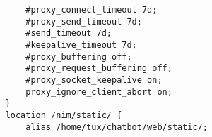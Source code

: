 \documentclass{article}
\begin{document}
\begin{verbatim}
        #proxy_connect_timeout 7d;                                                                                                                                                                                                                            
        #proxy_send_timeout 7d;                                                                                                                                                                                                                               
        #send_timeout 7d;                                                                                                                                                                                                                                     
        #keepalive_timeout 7d;                                                                                                                                                                                                                                
        #proxy_buffering off;                                                                                                                                                                                                                                 
        #proxy_request_buffering off;                                                                                                                                                                                                                         
        #proxy_socket_keepalive on;                                                                                                                                                                                                                           
        proxy_ignore_client_abort on;                                                                                                                                                                                                                         
    }                                                                                                                                                                                                                                                         
    location /nim/static/ {                                                                                                                                                                                                                                   
        alias /home/tux/chatbot/web/static/;                                                                                                                                                                                                                  

\end{verbatim}
\end{document}
